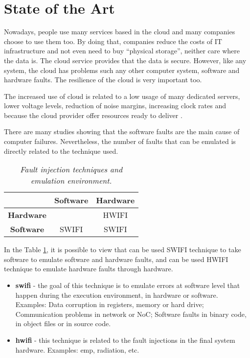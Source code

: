\newpage
\section{State of the Art}

Nowadays, people use many services based in the cloud and many companies choose to use them too. By doing that, companies reduce the costs of IT infrastructure and not even need to buy ``physical storage'', neither care where the data is. The cloud service provides that the data is secure.
However, like any system, the cloud has problems such any other computer system, software and hardware faults. The resilience of the cloud is very important too.


The increased use of cloud is related to a low usage of many dedicated servers, lower voltage levels, reduction of noise margins, increasing clock rates and because the cloud provider offer resources ready to deliver \cite{wolter2012resilience}.

There are many studies showing that the software faults\cite{avizzienisbasic} are the main cause of computer failures. Nevertheless, the number of faults that can be emulated is directly related to the technique used.

\begin{table}[h]
\centering
\begin{tabular}{c|c|c}
         & \textbf{Software} & \textbf{Hardware} \\ \hline
\textbf{Hardware} &          & HWIFI    \\ \hline
\textbf{Software} & SWIFI    & SWIFI
\end{tabular}
\caption{\small \sl Fault injection techniques and emulation environment.}
\label{tab:swifi_hwifi}
\end{table}

In the Table \ref{tab:swifi_hwifi}, it is possible to view that can be used SWIFI technique to take software to emulate software and hardware faults, and can be used HWIFI technique to emulate hardware faults through hardware.

\begin{itemize}
	\item \textbf{\ac{swifi}} - the goal of this technique is to emulate errors at software level that happen during the execution environment, in hardware or software. Examples: Data corruption in registers, memory or hard drive; Communication problems in network or NoC; Software faults in binary code, in object files or in source code.

	\item \textbf{\ac{hwifi}} - this technique is related to the fault injections in the final system hardware. Examples: \ac{emp}, radiation, etc.

\end{itemize}

